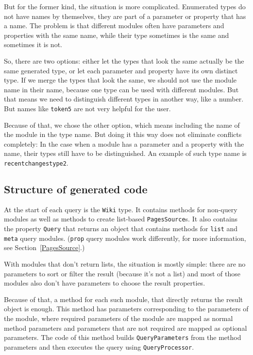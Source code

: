 But for the former kind, the situation is more complicated.
Enumerated types do not have names by themselves, they are part of a parameter or property that has a name.
The problem is that different modules often have parameters and properties with the same name,
while their type sometimes is the same and sometimes it is not.

So, there are two options: either let the types that look the same actually be the same generated type,
or let each parameter and property have its own distinct type.
If we merge the types that look the same, we should not use the module name in their name,
because one type can be used with different modules.
But that means we need to distinguish different types in another way, like a number.
But names like \lstinline{token5} are not very helpful for the user.

Because of that, we chose the other option, which means including the name of the module in the type name.
But doing it this way does not eliminate conflicts completely:
In the case when a module has a parameter and a property with the name,
their types still have to be distinguished.
An example of such type name is \lstinline{recentchangestype2}.

\subsection{Structure of generated code}

At the start of each query is the \lstinline{Wiki} type.
It contains methods for non-query modules as well as methods to create list-based \lstinline{PagesSource}s.
It also contains the property \lstinline{Query} that returns an object that contains methods for
\texttt{list} and \texttt{meta} query modules.
(\texttt{prop} query modules work differently, for more information, see Section~\ref{PagesSource}.)

\medskip

With modules that don't return lists, the situation is mostly simple:
there are no parameters to sort or filter the result (because it's not a list)
and most of those modules also don't have parameters to choose the result properties.

Because of that, a method for each such module, that directly returns the result object is enough.
This method has parameters corresponding to the parameters of the module,
where required parameters of the module are mapped as normal method parameters
and parameters that are not required are mapped as optional parameters.
The code of this method builds \lstinline{QueryParameters} from the method parameters
and then executes the query using \lstinline{QueryProcessor}.

